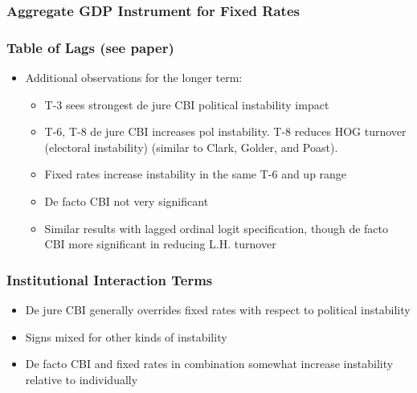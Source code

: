 \documentclass{beamer}
\begin{document}
    \begin{frame}
        \frametitle{Aggregate GDP Instrument for Fixed Rates}
        {
            \let\oldcentering\centering
            \renewcommand\centering{\tiny\oldcentering}
            
        }
    \end{frame}

    \begin{frame}
        \frametitle{Table of Lags (see paper)}
        \begin{itemize}
            \item Additional observations for the longer term:
            \begin{itemize}
                \item T-3 sees strongest de jure CBI political instability impact
                \item T-6, T-8 de jure CBI increases pol instability. T-8 reduces HOG turnover (electoral instability) (similar to Clark, Golder, and Poast).
                \item Fixed rates increase instability in the same T-6 and up range
                \item De facto CBI not very significant
                \item Similar results with lagged ordinal logit specification, though de facto CBI more significant in reducing L.H. turnover
            \end{itemize}
        \end{itemize}
    \end{frame}

    \begin{frame}
        \frametitle{Institutional Interaction Terms}
        \begin{itemize}
            \item De jure CBI generally overrides fixed rates with respect to political instability
            \item Signs mixed for other kinds of instability
            \item De facto CBI and fixed rates in combination somewhat increase instability relative to individually
        \end{itemize}
    \end{frame}
\end{document}
